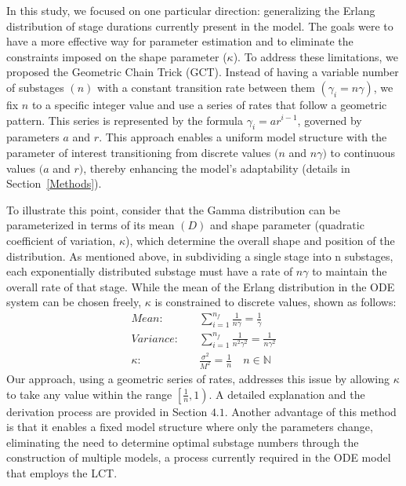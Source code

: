 \documentclass[12pt]{article}
\newcommand{\sref}[1]{Section~\ref{#1}}
\begin{document}
In this study, we focused on one particular direction: generalizing the Erlang distribution of stage durations currently present in the model. The goals were to have a more effective way for parameter estimation and to eliminate the constraints imposed on the shape parameter ($\kappa$). To address these limitations, we proposed the Geometric Chain Trick (GCT). Instead of having a variable number of substages $(n)$ with a constant transition rate between them $(\gamma_i = n\gamma)$, we fix $n$ to a specific integer value and use a series of rates that follow a geometric pattern. This series is represented by the formula $\gamma_i = ar^{i-1}$, governed by parameters $a$ and $r$. This approach enables a uniform model structure with the parameter of interest transitioning from discrete values $(n$ and $n\gamma)$ to continuous values $(a$ and $r)$, thereby enhancing the model's adaptability (details in \sref{Methods}).

To illustrate this point, consider that the Gamma distribution can be parameterized in terms of its mean $(D)$ and shape parameter (quadratic coefficient of variation, $\kappa$), which determine the overall shape and position of the distribution. As mentioned above, in subdividing a single stage into n substages, each exponentially distributed substage must have a rate of $n\gamma$ to maintain the overall rate of that stage. While the mean of the Erlang distribution in the ODE system can be chosen freely, $\kappa$ is constrained to discrete values, shown as follows:
\begin{align*}
    Mean: \quad &\sum_{i=1}^{n_f} \frac{1}{n\gamma} = \frac{1}{\gamma}\\
    Variance: \quad &\sum_{i=1}^{n_f} \frac{1}{n^2\gamma^2} = \frac{1}{n\gamma^2} \\
    \kappa: \quad &\frac{\sigma^2}{M^2} = \frac{1}{n} \quad n \in \mathbb{N}
\end{align*}
Our approach, using a geometric series of rates, addresses this issue by allowing $\kappa$ to take any value within the range $\left[ \frac{1}{n}, 1 \right)$. A detailed explanation and the derivation process are provided in Section $4.1$. Another advantage of this method is that it enables a fixed model structure where only the parameters change, eliminating the need to determine optimal substage numbers through the construction of multiple models, a process currently required in the ODE model that employs the LCT.
\end{document}
